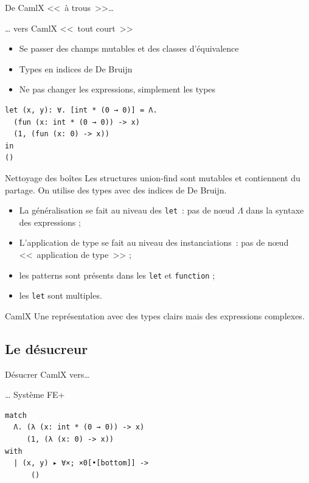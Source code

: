 \documentclass[final]{beamer}
\begin{document}
\begin{frame}[fragile]{De CamlX <<~à trous~>>…}

  … vers CamlX <<~tout court~>>

  \begin{itemize}
    \item Se passer des champs mutables et des classes d'équivalence
    \item Types en indices de De Bruijn
    \item Ne pas changer les expressions, simplement les types
  \end{itemize}

  \begin{verbatim}
let (x, y): ∀. [int * (0 → 0)] = Λ. 
  (fun (x: int * (0 → 0)) -> x)
  (1, (fun (x: 0) -> x))
in
()
  \end{verbatim}
\end{frame}

\begin{frame}{Nettoyage des boîtes}
 Les structures union-find sont mutables et contiennent du partage. On utilise
 des types avec des indices de De Bruijn.

 \begin{itemize}
   \item La généralisation se fait au niveau des \texttt{let}~: pas de nœud
     $\Lambda$ dans la syntaxe des expressions ;
   \item L'application de type se fait au niveau des instanciations~: pas de
     nœud <<~application de type~>> ;
   \item les patterns sont présents dans les \texttt{let} et \texttt{function} ;
   \item les \texttt{let} sont multiples.
 \end{itemize}

 \begin{block}{CamlX}
 Une représentation avec des types clairs mais des expressions complexes.
 \end{block}
\end{frame}

\subsection{Le désucreur}

\begin{frame}[fragile]{Désucrer CamlX vers…}

… Système FE+

  \begin{verbatim}
match
  Λ. (λ (x: int * (0 → 0)) -> x)
     (1, (λ (x: 0) -> x))
with
  | (x, y) ▸ ∀×; ×0[•[bottom]] ->
      ()
  \end{verbatim}

\end{frame}
\end{document}
